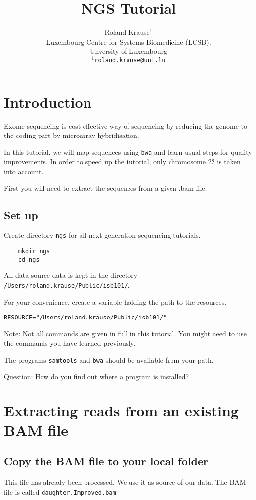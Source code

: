 \documentclass{article}
\title{  NGS Tutorial}
\author{Roland Krause$^1$ \\[1em]Luxembourg Centre for Systems Biomedicine (LCSB),\\ Unversity of Luxembourg\\
\texttt{$^1$roland.krause@uni.lu}}
\begin{document}
\maketitle

\tableofcontents

\section{Introduction}

Exome sequencing is cost-effective way of sequencing 
by reducing the genome to the coding part by microarray hybridisation.

In this tutorial, we will map sequences using \verb+bwa+ and learn usual steps for quality improvements.
In order to speed up the tutorial, only chromosome 22 is taken into account.

First you will need to extract the sequences from a given .bam file.
\subsection{Set up}
Create directory \verb+ngs+ for all next-generation sequencing tutorials.
 
\begin{verbatim}
 	mkdir ngs
	cd ngs
\end{verbatim}





All data source data is kept in the directory \verb+/Users/roland.krause/Public/isb101/+. 

For your convenience, create a variable holding the path to the resources.

\begin{verbatim}
RESOURCE="/Users/roland.krause/Public/isb101/"
\end{verbatim}

Note: Not all commands are given in full in this tutorial. 
You might need to use the commands you have learned previously.

The programs \verb+samtools+ and \verb+bwa+ should be available from your path.

Question: How do you find out where a program is installed?

\section{Extracting reads from an existing BAM file}
\subsection{Copy the BAM file to your local folder}
This file has already been processed. We use it as source of our data.
The BAM file is called  \verb+daughter.Improved.bam+
\end{document}
